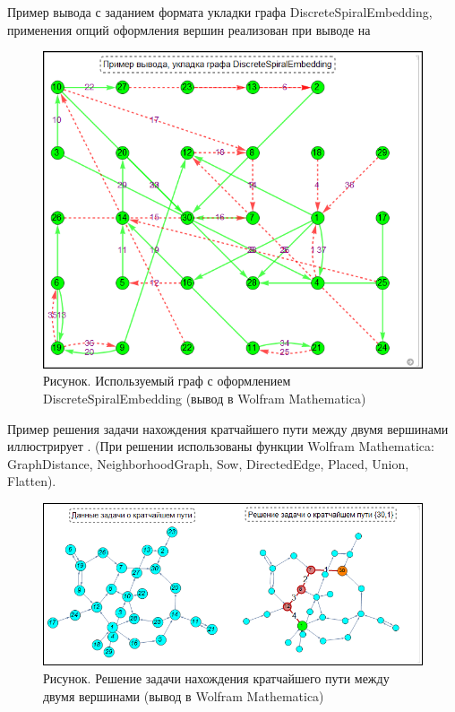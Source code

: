 Пример вывода с заданием формата укладки графа DiscreteSpiralEmbedding, применения опций оформления вершин реализован при выводе на \textit{} 

\begin{figure}[H]
	\centering
	\includegraphics[scale=0.87]{images/part7/chapter_integration/integr_alg34.png}
	\caption{Рисунок. Используемый граф с оформлением DiscreteSpiralEmbedding (вывод в Wolfram Mathematica)}
	\label{fig:integr_alg34}
\end{figure}

Пример решения задачи нахождения кратчайшего пути между двумя вершинами иллюстрирует \textit{}. (При решении использованы функции Wolfram Mathematica: GraphDistance, NeighborhoodGraph, Sow, DirectedEdge, Placed, Union, Flatten).

\begin{figure}[H]
	\centering
	\includegraphics[scale=0.55]{images/part7/chapter_integration/integr_alg35.png}
	\caption{Рисунок. Решение задачи нахождения кратчайшего пути между двумя вершинами (вывод в Wolfram Mathematica)}
	\label{fig:integr_alg35}
\end{figure}

